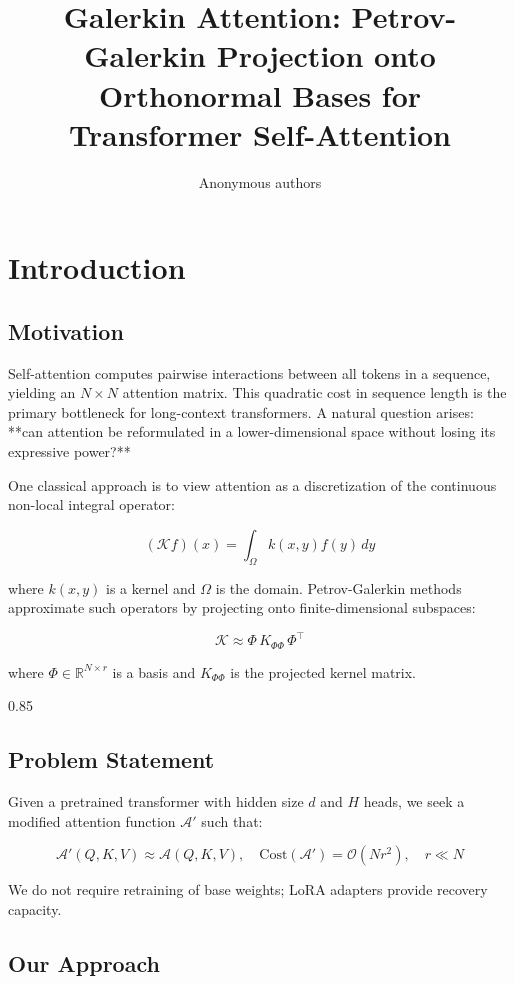 \title{\textbf{Galerkin Attention: Petrov-Galerkin Projection onto Orthonormal Bases for Transformer Self-Attention}}

\author{Anonymous authors}



\section{Introduction}

\subsection{Motivation}

Self-attention computes pairwise interactions between all tokens in a 
sequence, yielding an $N \times N$ attention matrix. This quadratic cost 
in sequence length is the primary bottleneck for long-context transformers. 
A natural question arises: **can attention be reformulated in a lower-dimensional 
space without losing its expressive power?**

One classical approach is to view attention as a discretization of the 
continuous non-local integral operator:

\[
(\mathcal{K} f)(x) = \int_\Omega k(x, y) f(y) \, dy
\]

where $k(x, y)$ is a kernel and $\Omega$ is the domain. Petrov-Galerkin 
methods approximate such operators by projecting onto finite-dimensional 
subspaces:

\[
\mathcal{K} \approx \Phi \, K_{\Phi \Phi} \, \Phi^\top
\]

where $\Phi \in \mathbb{R}^{N \times r}$ is a basis and $K_{\Phi \Phi}$ is 
the projected kernel matrix.

0.85


\subsection{Problem Statement}

Given a pretrained transformer with hidden size $d$ and $H$ heads, we seek 
a modified attention function $\mathcal{A}'$ such that:

\[
\mathcal{A}'(Q, K, V) \approx \mathcal{A}(Q, K, V), \quad
\text{Cost}(\mathcal{A}') = \mathcal{O}(Nr^2), \quad r \ll N
\]

We do not require retraining of base weights; LoRA adapters provide 
recovery capacity.

\subsection{Our Approach}

